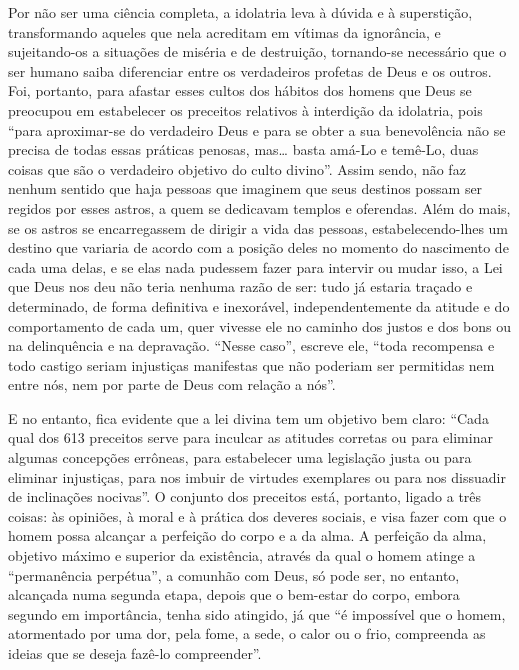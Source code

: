 Por não ser uma ciência completa, a idolatria leva à dúvida e à
superstição, transformando aqueles que nela acreditam em vítimas da
ignorância, e sujeitando-os a situações de miséria e de destruição,
tornando-se necessário que o ser humano saiba diferenciar entre os
verdadeiros profetas de Deus e os outros. Foi, portanto, para afastar
esses cultos dos hábitos dos homens que Deus se preocupou em estabelecer
os preceitos relativos à interdição da idolatria, pois ``para
aproximar-se do verdadeiro Deus e para se obter a sua benevolência não
se precisa de todas essas práticas penosas, mas\ldots{} basta amá-Lo e
temê-Lo, duas coisas que são o verdadeiro objetivo do culto divino''.
Assim sendo, não faz nenhum sentido que haja pessoas que imaginem que
seus destinos possam ser regidos por esses astros, a quem se dedicavam
templos e oferendas. Além do mais, se os astros se encarregassem de
dirigir a vida das pessoas, estabelecendo-lhes um destino que variaria
de acordo com a posição deles no momento do
nascimento de cada uma delas, e se elas nada pudessem fazer para
intervir ou mudar isso, a Lei que Deus nos deu não teria nenhuma razão
de ser: tudo já estaria traçado e determinado, de forma definitiva e
inexorável, independentemente da atitude e do comportamento de cada um,
quer vivesse ele no caminho dos justos e dos bons ou na delinquência e
na depravação. ``Nesse caso'', escreve ele, ``toda recompensa e todo
castigo seriam injustiças manifestas que não poderiam ser permitidas nem
entre nós, nem por parte de Deus com relação a nós''.

E no entanto, fica evidente que a lei divina tem um objetivo bem claro:
``Cada qual dos 613 preceitos serve para inculcar as atitudes corretas
ou para eliminar algumas concepções errôneas, para estabelecer uma
legislação justa ou para eliminar injustiças, para nos imbuir de
virtudes exemplares ou para nos dissuadir de inclinações nocivas''. O
conjunto dos preceitos está, portanto, ligado a três coisas: às
opiniões, à moral e à prática dos deveres sociais, e visa fazer com que
o homem possa alcançar a perfeição do corpo e a da alma. A perfeição da
alma, objetivo máximo e superior da existência, através da qual o homem
atinge a ``permanência perpétua'', a comunhão com Deus, só pode ser, no
entanto, alcançada numa segunda etapa, depois que o bem-estar do corpo,
embora segundo em importância, tenha sido atingido, já que ``é
impossível que o homem, atormentado por uma dor, pela fome, a sede, o
calor ou o frio, compreenda as ideias que se deseja fazê-lo
compreender''.

